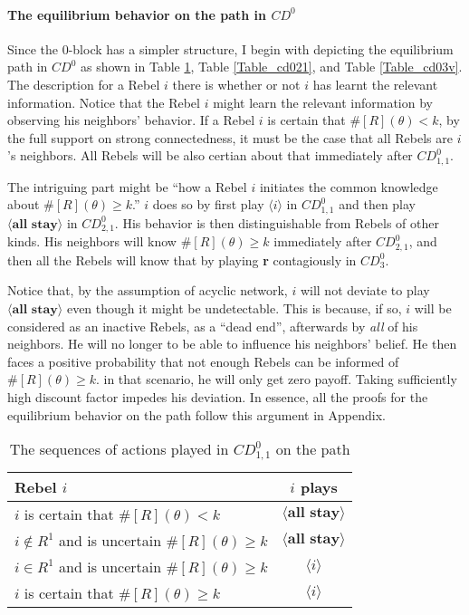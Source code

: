 \documentclass[12pt,letter]{article}
\theoremstyle{definition}
\theoremstyle{remark}
\theoremstyle{claim}
\begin{document}
\paragraph{The equilibrium behavior on the path in $CD^0$}
Since the $0$-block has a simpler structure, I begin with depicting the equilibrium path in $CD^0$ as shown in Table \ref{Table_cd011}, Table \ref{Table_cd021}, and Table \ref{Table_cd03v}. The description for a Rebel $i$ there is whether or not $i$ has learnt the relevant information. Notice that the Rebel $i$ might learn the relevant information by observing his neighbors' behavior. If a Rebel $i$ is certain that $\#[R](\theta)<k$, by the full support on strong connectedness, it must be the case that all Rebels are $i$'s neighbors. All Rebels will be also certian about that immediately after $CD^0_{1,1}$. 

The intriguing part might be ``how a Rebel $i$ initiates the common knowledge about $\#[R](\theta)\geq k$.'' $i$ does so by first play $\langle i \rangle$ in $CD^0_{1,1}$ and then play $\langle \textbf{all stay} \rangle$ in $CD^0_{2,1}$. His behavior is then distinguishable from Rebels of other kinds. His neighbors will know $\#[R](\theta)\geq k$ immediately after $CD^0_{2,1}$, and then all the Rebels will know that by playing \textbf{r} contagiously in $CD^0_{3}$. 

Notice that, by the assumption of acyclic network, $i$ will not deviate to play $\langle \textbf{all stay} \rangle$ even though it might be undetectable. This is because, if so, $i$ will be considered as an inactive Rebels, as a ``dead end'', afterwards by \textit{all} of his neighbors. He will no longer to be able to influence his neighbors' belief. He then faces a positive probability that not enough Rebels can be informed of $\#[R](\theta)\geq k$. in that scenario, he will only get zero payoff. Taking sufficiently high discount factor impedes his deviation. In essence, all the proofs for the equilibrium behavior on the path follow this argument in Appendix.

\begin{table}[!htbp]
\caption{The sequences of actions played in $CD^0_{1,1}$ on the path}
\label{Table_cd011}
\begin{center}
\begin{tabular}{l c}
Rebel $i$ 	 	&  	$i$ plays		 \\
\hline
\hline
$i$ is certain that $\#[R](\theta)<k$ 	& 	$\langle \textbf{all stay} \rangle$	\\
$i\notin R^{1}$ and is uncertain $\#[R](\theta)\geq k$	& 	$\langle \textbf{all stay} \rangle$	\\
$i\in R^{1}$ and is uncertain $\#[R](\theta)\geq k$ &  $\langle i \rangle$  \\
$i$ is certain that $\#[R](\theta)\geq k$ &  $\langle i \rangle$  \\
\hline
\end{tabular}
\end{center}
\end{table}
\end{document}
